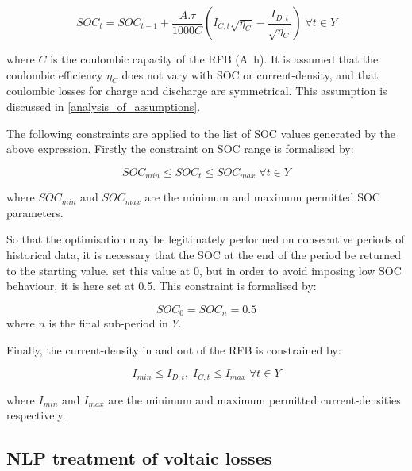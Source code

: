 \documentclass[preprint,3p,review,authoryear,10pt]{elsarticle}
\begin{document}
\begin{equation}
\label{eqn: Method_SOC_Tracker}
SOC_t = SOC_{t-1} + \frac{A.\tau}{1000C}(I_{C,t}\sqrt{\eta_C} - \frac{I_{D,t}}{\sqrt{\eta_C}}) \; \forall t \in Y
\end{equation}

where $C$ is the coulombic capacity of the RFB (\si{\ampere\hour}). It is assumed that the coulombic efficiency $\eta_C$ does not vary with SOC or current-density, and that coulombic losses for charge and discharge are symmetrical. This assumption is discussed in \cref{analysis_of_assumptions}. 

The following constraints are applied to the list of SOC values generated by the above expression. Firstly the constraint on SOC range is formalised by:

\begin{equation}
\label{eqn: Method_Constraint_SOC_Range}
SOC_{min} \leq SOC_t \leq SOC_{max} \; \forall t \in Y
\end{equation}

where $SOC_{min}$ and $SOC_{max}$ are the minimum and maximum permitted SOC parameters.

So that the optimisation may be legitimately performed on consecutive periods of historical data, it is necessary that the SOC at the end of the period be returned to the starting value. \cite{Hu2010} set this value at 0, but in order to avoid imposing low SOC behaviour, it is here set at 0.5. This constraint is formalised by:

\begin{equation}
\label{eqn: Method_Constraint_E_Conservation}
SOC_0 = SOC_n = 0.5
\end{equation}
where $n$ is the final sub-period in $Y$.

Finally, the current-density in and out of the RFB is constrained by:

\begin{equation}
\label{eqn: Method_Constraint_Ia}
I_{min} \leq I_{D,t}, \; I_{C,t} \leq I_{max} \; \forall t \in Y
\end{equation}

where $I_{min}$ and $I_{max}$ are the minimum and maximum permitted current-densities respectively.

\subsection{NLP treatment of voltaic losses}
\label{Model_Formulation_NLP_treatment_voltaic_losses}
\end{document}

